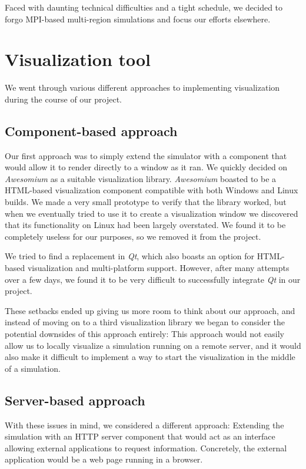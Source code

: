 \documentclass[a4paper,12pt]{article}
\begin{document}
Faced with daunting technical difficulties and a tight schedule, we decided to forgo MPI-based multi-region simulations and focus our efforts elsewhere.

\section{Visualization tool}
We went through various different approaches to implementing visualization during the course of our project.

\subsection{Component-based approach}
Our first approach was to simply extend the simulator with a component that would allow it to render directly to a window as it ran. We quickly decided on \textit{Awesomium} as a suitable visualization library. \textit{Awesomium} boasted to be a HTML-based visualization component compatible with both Windows and Linux builds. We made a very small prototype to verify that the library worked, but when we eventually tried to use it to create a visualization window we discovered that its functionality on Linux had been largely overstated. We found it to be completely useless for our purposes, so we removed it from the project.

We tried to find a replacement in \textit{Qt}, which also boasts an option for HTML-based visualization and multi-platform support. However, after many attempts over a few days, we found it to be very difficult to successfully integrate \textit{Qt} in our project.

These setbacks ended up giving us more room to think about our approach, and instead of moving on to a third visualization library we began to consider the potential downsides of this approach entirely: This approach would not easily allow us to locally visualize a simulation running on a remote server, and it would also make it difficult to implement a way to start the visualization in the middle of a simulation.

\subsection{Server-based approach}
With these issues in mind, we considered a different approach: Extending the simulation with an HTTP server component that would act as an interface allowing external applications to request information. Concretely, the external application would be a web page running in a browser.
\end{document}
